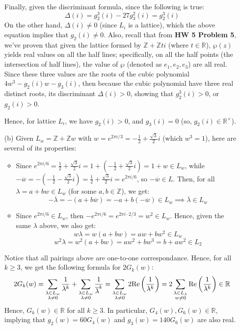 \documentclass{article}
\begin{document}
\begin{itemize}
    Finally, given the discriminant formula, since the following is true:
    $$\Delta(i)=g_2^3(i)-27g_3^2(i) = g_2^3(i)$$
    On the other hand, $\Delta(i)\neq 0$ (since $L_i$ is a lattice), which the above equation implies that $g_2(i)\neq 0$.
    Also, recall that from \textbf{HW 5 Problem 5}, we've proven that given the lattice formed by $\mathbb{Z}+\mathbb{Z}ti$ (where $t\in\mathbb{R}$), $\wp(z)$ yields real values on all the half lines; specifically, on all the half points (the intersection of half lines), the value of $\wp$ (denoted as $e_1,e_2,e_3$) are all real. Since these three values are the roots of the cubic polynomial $4w^3-g_2(i)w-g_3(i)$, then because the cubic polynomial have three real distinct roots, its discriminant $\Delta(i) >0$, showing that $g_2^3(i)>0$, or $g_2(i)>0$.

    Hence, for lattice $L_i$, we have $g_2(i)>0$, and $g_3(i)=0$ (so, $g_2(i)\in\mathbb{R}^\times$).

    \hfil
    
    \item[(b)] Given $L_w=\mathbb{Z}+\mathbb{Z}w$ with $w=e^{2\pi i/3} = -\frac{1}{2}+\frac{\sqrt{3}}{2}i$ (which $w^3 = 1$), here are several of its properties:
    \begin{itemize}
        \item Since $e^{2\pi i/6} = \frac{1}{2}+\frac{\sqrt{3}}{2}i = 1+(-\frac{1}{2}+\frac{\sqrt{3}}{2}i)= 1+w\in L_w$, while $-\overline{w} = -(-\frac{1}{2}-\frac{\sqrt{3}}{2}i) = \frac{1}{2}+\frac{\sqrt{3}}{2}i = e^{2\pi i/6}$, so $-\overline{w}\in L$. Then, for all $\lambda = a+bw\in L_w$ (for some $a,b\in\mathbb{Z}$), we get:
        $$-\overline{\lambda} = -(a+b\overline{w}) = -a+b(-\overline{w})\in L_w\implies\overline{\lambda}\in L_w$$
        \item Since $e^{2\pi i/6}\in L_w$, then $-e^{2\pi i/6} = e^{2\pi i\cdot2/3} = w^2\in L_w$. Hence, given the same $\lambda$ above, we also get:
        $$w\lambda = w(a+bw) = aw + bw^2 \in L_w$$
        $$w^2\lambda = w^2(a+bw) = aw^2+bw^3 = b+aw^2\in L_2$$
    \end{itemize}
    Notice that all pairings above are one-to-one correspondance. Hence, for all $k\geq 3$, we get the following formula for $2G_k(w)$:
    $$2G_k(w)=\sum_{\substack{\lambda\in L_w\\\lambda\neq 0}}\frac{1}{\lambda^k}+\sum_{\substack{\lambda\in L_w\\\lambda\neq 0}}\frac{1}{\overline{\lambda}^k} = \sum_{\substack{\lambda\in L_w\\\lambda\neq 0}}2\textmd{Re}\left(\frac{1}{\lambda^k}\right) = 2\sum_{\substack{\lambda\in L_\lambda\\w\neq 0}}\textmd{Re}\left(\frac{1}{\lambda^k}\right) \in \mathbb{R}$$ 
    Hence, $G_k(w)\in\mathbb{R}$ for all $k\geq 3$. In particular, $G_4(w),G_6(w)\in\mathbb{R}$, implying that $g_2(w)=60G_4(w)$ and $g_3(w)=140G_6(w)$ are also real.
    

\end{itemize}
\end{document}
